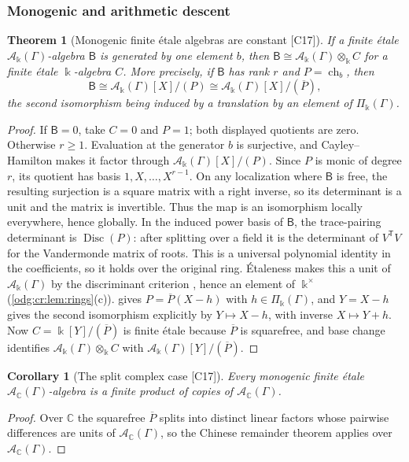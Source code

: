 \documentclass[11pt,oneside]{article}
\numberwithin{equation}{section}
\newtheorem{theorem}{Theorem}[section]
\newtheorem{corollary}[corollary]{Corollary}
\theoremstyle{definition}
\theoremstyle{remark}
\newcommand{\C}{\mathbb C}
\newcommand{\src}[1]{\textup{\textsf{\small[#1]}}}
\newcommand{\crA}{\mathcal A_\Bbbk(\Gamma)}
\newcommand{\crP}{\Pi_\Bbbk(\Gamma)}
\newcommand{\Disc}{\operatorname{Disc}}
\begin{document}
\subsubsection{Monogenic and arithmetic descent}\label{odg:disc:sub:monogenic}

\begin{theorem}[Monogenic finite \'etale algebras are constant \src{C17}]\label{odg:disc:thm:monogenic}
If a finite \'etale $\crA$-algebra $\mathsf B$ is generated by one element $b$, then
$\mathsf B\cong\crA\otimes_\Bbbk C$ for a finite \'etale $\Bbbk$-algebra $C$. More
precisely, if $\mathsf B$ has rank $r$ and $P=\operatorname{ch}_b$, then
\[
 \mathsf B\cong\crA[X]/(P)\cong\crA[X]/(\overline P),
\]
the second isomorphism being induced by a translation by an element of $\crP$.
\end{theorem}
\begin{proof}
If $\mathsf B=0$, take $C=0$ and $P=1$; both displayed quotients are zero. Otherwise
$r\ge1$. Evaluation at the generator $b$ is surjective, and Cayley--Hamilton makes it
factor through $\crA[X]/(P)$. Since $P$ is monic of degree $r$, its quotient has basis
$1,X,\ldots,X^{r-1}$. On any localization where $\mathsf B$ is free, the resulting
surjection is a square matrix with a right inverse, so its determinant is a unit and
the matrix is invertible. Thus the map is an isomorphism locally everywhere, hence
globally. In the induced power basis of $\mathsf B$, the trace-pairing determinant is
$\Disc(P)$: after splitting over a field it is the determinant of $V^{\mathsf T}V$ for
the Vandermonde matrix of roots. This is a universal polynomial identity in the
coefficients, so it holds over the original ring. \'Etaleness makes this a unit of
$\crA$ by the discriminant criterion
\cite{StacksDisc}, hence an element of $\Bbbk^\times$ (\cref{odg:cr:lem:rings}(c)).
 gives $P=\overline P(X-h)$ with $h\in\crP$, and $Y=X-h$
gives the second isomorphism explicitly by $Y\mapsto X-h$, with inverse $X\mapsto Y+h$.
Now $C=\Bbbk[Y]/(\overline P)$ is finite \'etale because $\overline P$ is squarefree,
and base change identifies $\crA\otimes_\Bbbk C$ with $\crA[Y]/(\overline P)$.
\end{proof}

\begin{corollary}[The split complex case \src{C17}]\label{odg:disc:cor:split}
Every monogenic finite \'etale $\mathcal A_\C(\Gamma)$-algebra is a finite product of copies
of $\mathcal A_\C(\Gamma)$.
\end{corollary}
\begin{proof}
Over $\C$ the squarefree $\overline P$ splits into distinct linear factors whose pairwise
differences are units of $\mathcal A_\C(\Gamma)$, so the Chinese remainder theorem applies
over $\mathcal A_\C(\Gamma)$.
\end{proof}
\end{document}
